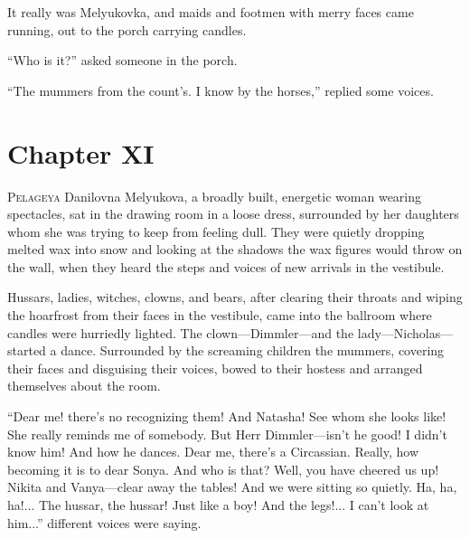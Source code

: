 It really was Melyukovka, and maids and footmen with merry faces
came running, out to the porch carrying candles.

``Who is it?'' asked someone in the porch.

``The mummers from the count's. I know by the horses,'' replied
some voices.


\chapter*{Chapter XI}
\ifaudio
{} 
\fi

\lettrine[lines=2, loversize=0.3, lraise=0]{\initfamily P}{elageya}
Danilovna Melyukova, a broadly built, energetic woman
wearing spectacles, sat in the drawing room in a loose dress,
surrounded by her daughters whom she was trying to keep from
feeling dull. They were quietly dropping melted wax into snow and
looking at the shadows the wax figures would throw on the wall,
when they heard the steps and voices of new arrivals in the
vestibule.

Hussars, ladies, witches, clowns, and bears, after clearing their
throats and wiping the hoarfrost from their faces in the
vestibule, came into the ballroom where candles were hurriedly
lighted. The clown---Dimmler---and the lady---Nicholas---started
a dance. Surrounded by the screaming children the mummers,
covering their faces and disguising their voices, bowed to their
hostess and arranged themselves about the room.

``Dear me! there's no recognizing them! And Natasha! See whom she
looks like! She really reminds me of somebody. But Herr
Dimmler---isn't he good! I didn't know him! And how he
dances. Dear me, there's a Circassian. Really, how becoming it is
to dear Sonya. And who is that?  Well, you have cheered us up!
Nikita and Vanya---clear away the tables!  And we were sitting so
quietly. Ha, ha, ha!... The hussar, the hussar!  Just like a boy!
And the legs!... I can't look at him...'' different voices were
saying.

